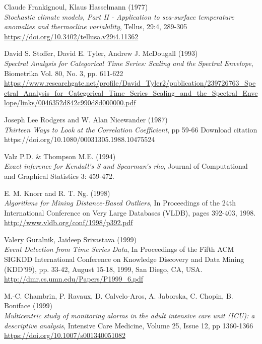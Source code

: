 \documentclass[12pt,a4paper]{article}
\begin{document}
\begin{thebibliography}{9}
Claude Frankignoul, Klaus Hasselmann (1977) \\
\textit{Stochastic climate models, Part II - Application to sea-surface temperature anomalies and thermocline variability},
Tellus, 29:4, 289-305\\
\url{https://doi.org/10.3402/tellusa.v29i4.11362}

David S. Stoffer, David E. Tyler, Andrew J. McDougall (1993)\\
\textit{Spectral Analysis for Categorical Time Series: Scaling and the Spectral Envelope},
Biometrika Vol. 80, No. 3, pp. 611-622\\
\url{https://www.researchgate.net/profile/David_Tyler2/publication/239726763_Spectral_Analysis_for_Categorical_Time_Series_Scaling_and_the_Spectral_Envelope/links/0046352d842c990d8d000000.pdf}

Joseph Lee Rodgers and W. Alan Nicewander (1987)\\
\textit{Thirteen Ways to Look at the Correlation Coefficient}, pp 59-66
Download citation  https://doi.org/10.1080/00031305.1988.10475524

Valz P.D. \& Thompson M.E. (1994) \\
\textit{Exact inference for Kendall's
S and Spearman's rho}, Journal of Computational and
Graphical Statistics 3: 459-472.

E. M. Knorr and R. T. Ng. (1998)\\
\textit{Algorithms for Mining Distance-Based Outliers}, In Proceedings of the 24th
International Conference on Very Large Databases (VLDB), pages 392-403, 1998.\\
\url{http://www.vldb.org/conf/1998/p392.pdf}

Valery Guralnik, Jaideep Srivastava (1999)\\
\textit{Event Detection from Time Series Data}, In Proceedings of the Fifth ACM SIGKDD International Conference on Knowledge Discovery and Data Mining (KDD'99), pp. 33-42, August 15-18, 1999, San Diego, CA, USA. \\
\url{http://dmr.cs.umn.edu/Papers/P1999_6.pdf}

M.-C. Chambrin, P. Ravaux, D. Calvelo-Aros, A. Jaborska, C. Chopin, B. Boniface (1999)\\
\textit{Multicentric study of monitoring alarms in the adult intensive care unit (ICU): a descriptive analysis},
Intensive Care Medicine, Volume 25, Issue 12, pp 1360-1366\\
\url{https://doi.org/10.1007/s001340051082}


\end{thebibliography}
\end{document}
